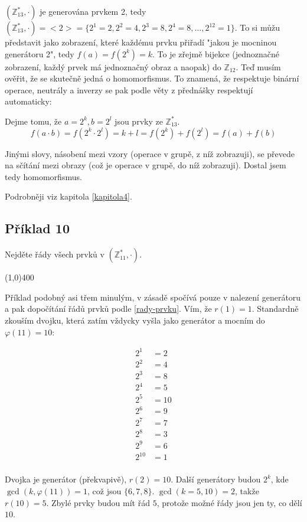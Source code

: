 \documentclass{article}
\begin{document}
$(\mathbb{Z}_{13}^{*},\cdot)$ je generována prvkem 2, tedy $(\mathbb{Z}_{13}^{*},\cdot) = {<}2{>} = \{2^1=2, 2^2=4, 2^3=8, 2^4 = 8,\ldots,2^{12}=1\}$. To si můžu představit jako zobrazení, které každému prvku přiřadí "jakou je mocninou generátoru 2", tedy $f(a)=f(2^k)=k$. To je zřejmě bijekce (jednoznačné zobrazení, každý prvek má jednoznačný obraz a naopak) do $\mathbb{Z}_{12}$. Teď musím ověřit, že se skutečně jedná o homomorfismus. To znamená, že respektuje binární operace, neutrály a inverzy se pak podle věty z přednášky respektují automaticky:

Dejme tomu, že $a = 2^k, b = 2^l$ jsou prvky ze $\mathbb{Z}_{13}^{*}$.
\[ f(a\cdot b) = f(2^k \cdot 2^l) = k + l = f(2^k) + f(2^l) = f(a) + f(b) \]

Jinými slovy, násobení mezi vzory (operace v grupě, z níž zobrazuji), se převede na sčítání mezi obrazy (což je operace v grupě, do níž zobrazuji). Dostal jsem tedy homomorfismus.   

Podrobněji viz kapitola \ref{kapitola4}.


\subsection{Příklad 10}
Nejděte řády všech prvků v $(\mathbb{Z}_{11}^*, \cdot)$.

\line(1,0){400}

Příklad podobný asi třem minulým, v zásadě spočívá pouze v nalezení generátoru a pak dopočítání řádů prvků podle \ref{rady-prvku}. Vím, že $r(1) = 1$. Standardně zkouším dvojku, která zatím vždycky vyšla jako generátor a mocním do $\varphi(11) = 10$:

\begin{align*}
2^1 & = 2\\
2^2 & = 4\\
2^3 & = 8\\
2^4 & = 5\\
2^5 & = 10\\
2^6 & = 9\\
2^7 & = 7\\
2^8 & = 3\\
2^9 & = 6\\
2^{10} & = 1\\
\end{align*}

Dvojka je generátor (překvapivě), $r(2) = 10$. Další generátory budou $2^k$, kde $\gcd(k, \varphi(11)) = 1$, což jsou $\{6,7,8\}$. $\gcd(k = 5,10) = 2$, takže $r(10) = 5$. Zbylé prvky budou mít řád $5$, protože možné řády jsou jen ty, co dělí $10$.  
\end{document}
